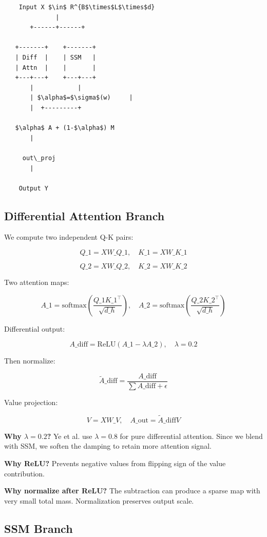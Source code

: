 \begin{lstlisting}
    Input X $\in$ R^{B$\times$L$\times$d}
              |
       +------+------+
                      
   +-------+    +-------+
   | Diff  |    | SSM   |
   | Attn  |    |       |
   +---+---+    +---+---+
       |            |
       | $\alpha$=$\sigma$(w)     |
       |  +---------+
           
   $\alpha$ A + (1-$\alpha$) M
       |
        
     out\_proj
       |
        
    Output Y
\end{lstlisting}

\subsection{Differential Attention Branch}

We compute two independent Q-K pairs:

\[
Q\_1 = X W\_{Q\_1}, \quad K\_1 = X W\_{K\_1}
\tag{4.1}
\]

\[
Q\_2 = X W\_{Q\_2}, \quad K\_2 = X W\_{K\_2}
\tag{4.2}
\]

Two attention maps:

\[
A\_1 = \text{softmax}\!\left(\frac{Q\_1 K\_1^\top}{\sqrt{d\_h}}\right), \quad
A\_2 = \text{softmax}\!\left(\frac{Q\_2 K\_2^\top}{\sqrt{d\_h}}\right)
\tag{4.3}
\]

Differential output:

\[
A\_\text{diff} = \text{ReLU}(A\_1 - \lambda A\_2), \quad \lambda = 0.2
\tag{4.4}
\]

Then normalize:

\[
\tilde{A}\_\text{diff} = \frac{A\_\text{diff}}{\sum A\_\text{diff} + \epsilon}
\tag{4.5}
\]

Value projection:

\[
V = X W\_V, \quad A\_\text{out} = \tilde{A}\_\text{diff} V
\tag{4.6}
\]

\textbf{Why $\lambda = 0.2$?} Ye et al. use $\lambda = 0.8$ for pure differential 
attention. Since we blend with SSM, we soften the damping to retain more 
attention signal.

\textbf{Why ReLU?} Prevents negative values from flipping sign of the value 
contribution.

\textbf{Why normalize after ReLU?} The subtraction can produce a sparse map with 
very small total mass. Normalization preserves output scale.

\subsection{SSM Branch}

